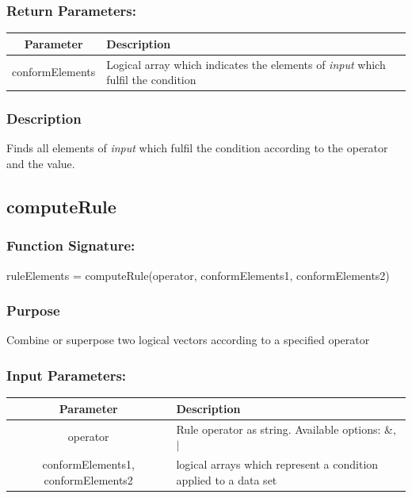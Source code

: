 \documentclass[a4]{scrreprt}
\begin{document}
\subsubsection{Return Parameters:}

\begin{longtabu} to \textwidth {|c|X|}
	\hline
	\textbf{Parameter} & \textbf{Description} \\ \hline
	\endhead
	conformElements & Logical array which indicates the elements of \textit{input} which fulfil the condition \\ \hline
\end{longtabu}

\subsubsection{Description}

Finds all elements of \textit{input} which fulfil the condition according to the operator and the value.

\subsection{computeRule}

\subsubsection{Function Signature:}

\begin{center}
	ruleElements = computeRule(operator, conformElements1, conformElements2)
\end{center}

\subsubsection{Purpose}

Combine or superpose two logical vectors according to a specified operator

\subsubsection{Input Parameters:}

\begin{longtabu} to \textwidth {|c|X|}
	\hline
	\textbf{Parameter} & \textbf{Description} \\ \hline
	\endhead
	operator & Rule operator as string. Available options: \&, $\vert$ \\ \hline
	conformElements1, conformElements2 & logical arrays which represent a condition applied to a data set \\ \hline
\end{longtabu}
\end{document}
